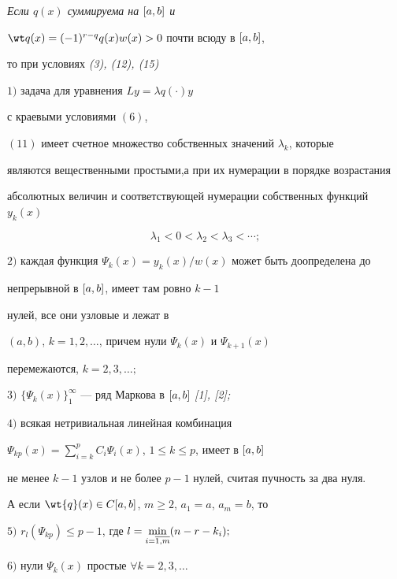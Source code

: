 {\it Если $q(x)$ суммируема на $[a,b]$ и 


$\wt q(x)=(-1)^{r-q}q(x)w(x)>0$ почти всюду в $[a,b]$, 


то при условиях {\em (3), (12), (15)}





$1)$ задача для уравнения $Ly=\lambda q(\cdot)y$ 


с краевыми условиями $(6)$,


$(11)$ имеет счетное множество собственных значений $\lambda_k$, которые


являются вещественными простыми,а при их нумерации в порядке возрастания


абсолютных величин и соответствующей нумерации собственных функций $y_k(x)$


$$


\lambda_1<0<\lambda_2<\lambda_3<\dotsb;


$$





$2)$ каждая функция $\Psi_k(x)=y_k(x)/w(x)$ может быть доопределена до


непрерывной в $[a,b]$, имеет там ровно $k-1$ 


нулей, все они узловые и лежат в 


$(a,b)$, $k=1,2,\dotsc$, причем нули $\Psi_k(x)$ и $\Psi_{k+1}(x)$


перемежаются, $k=2,3,\dotsc;$





$3)$ $\{\Psi_k(x) \}^\infty_1$ --- ряд Маркова в $[a,b]$ {\em [1], [2];}





$4)$ всякая нетривиальная линейная комбинация 


$\Psi_{kp}(x)=\sum\limits^p_{i=k}C_i\Psi_i(x)$, $1\le k\le p$, имеет в $[a,b]$


не менее $k-1$ узлов и не более $p-1$ нулей, считая пучность за два нуля.





А если $\wt{q}(x)\in C\ab$, $m\ge 2$, $a_1=a$, $a_m=b$, то





$5)$ $r_l(\Psi_{kp})\le p-1$, где $l=\min\limits_{i=\overline{1,m}}(n-r-k_i);$





$6)$ нули $\Psi_{k}(x)$ простые $\forall k=2,3,\dotsc$}


